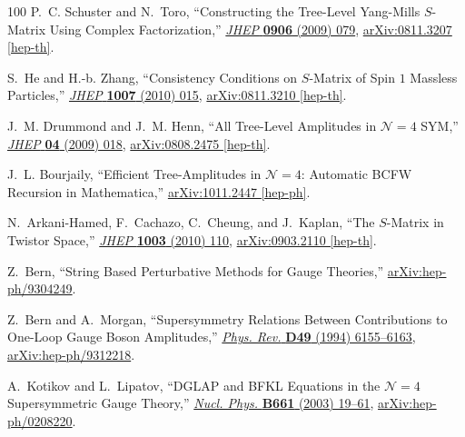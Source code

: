 \documentclass[12pt,hyperref,compress]{JHEP3}
\begin{document}
\begin{thebibliography}{100}
P.~C. Schuster and N.~Toro, ``{Constructing the Tree-Level Yang-Mills
  $S$-Matrix Using Complex Factorization},''
  \href{http://dx.doi.org/10.1088/1126-6708/2009/06/079}{{\em JHEP} {\bf 0906}
  (2009)  079},
\href{http://arxiv.org/abs/0811.3207}{{ arXiv:0811.3207 [hep-th]}}.

S.~He and H.-b. Zhang, ``{Consistency Conditions on $S$-Matrix of Spin $1$
  Massless Particles},'' \href{http://dx.doi.org/10.1007/JHEP07(2010)015}{{\em
  JHEP} {\bf 1007} (2010)  015},
\href{http://arxiv.org/abs/0811.3210}{{ arXiv:0811.3210 [hep-th]}}.

J.~M. Drummond and J.~M. Henn, ``{All Tree-Level Amplitudes in
  $\mathcal{N}\!=\!4$ SYM},''
  \href{http://dx.doi.org/10.1088/1126-6708/2009/04/018}{{\em JHEP} {\bf 04}
  (2009)  018},
\href{http://arxiv.org/abs/0808.2475}{{ arXiv:0808.2475 [hep-th]}}.

J.~L. Bourjaily, ``{Efficient Tree-Amplitudes in $\mathcal{N}\!=\!4$: Automatic
  BCFW Recursion in {\sc Mathematica}},''
\href{http://arxiv.org/abs/1011.2447}{{ arXiv:1011.2447 [hep-ph]}}.

N.~Arkani-Hamed, F.~Cachazo, C.~Cheung, and J.~Kaplan, ``{The $S$-Matrix in
  Twistor Space},'' \href{http://dx.doi.org/10.1007/JHEP03(2010)110}{{\em JHEP}
  {\bf 1003} (2010)  110},
\href{http://arxiv.org/abs/0903.2110}{{ arXiv:0903.2110 [hep-th]}}.

Z.~Bern, ``{String Based Perturbative Methods for Gauge Theories},''
\href{http://arxiv.org/abs/hep-ph/9304249}{{ arXiv:hep-ph/9304249}}.

Z.~Bern and A.~Morgan, ``{Supersymmetry Relations Between Contributions to
  One-Loop Gauge Boson Amplitudes},''
  \href{http://dx.doi.org/10.1103/PhysRevD.49.6155}{{\em Phys. Rev.} {\bf D49}
  (1994)  6155--6163},
\href{http://arxiv.org/abs/hep-ph/9312218}{{ arXiv:hep-ph/9312218}}.

A.~Kotikov and L.~Lipatov, ``{DGLAP and BFKL Equations in the
  $\mathcal{N}\!=\!4$ Supersymmetric Gauge Theory},''
  \href{http://dx.doi.org/10.1016/S0550-3213(03)00264-5}{{\em Nucl. Phys.} {\bf
  B661} (2003)  19--61},
\href{http://arxiv.org/abs/hep-ph/0208220}{{ arXiv:hep-ph/0208220}}.


\end{thebibliography}
\end{document}
